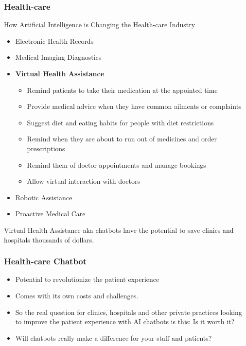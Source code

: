 \begin{frame}[fragile]\frametitle{Health-care}
How Artificial Intelligence is Changing the Health-care Industry

\begin{itemize}
\item Electronic Health Records
\item Medical Imaging Diagnostics
\item {\bf Virtual Health Assistance}
\begin{itemize}
\item Remind patients to take their medication at the appointed time
\item Provide medical advice when they have common ailments or complaints
\item  Suggest diet and eating habits for people with diet restrictions
\item  Remind when they are about to run out of medicines and order prescriptions
\item  Remind them of doctor appointments and manage bookings
\item  Allow virtual interaction with doctors
\end{itemize}
\item Robotic Assistance
\item Proactive Medical Care
\end{itemize}

Virtual Health Assistance aka chatbots have the potential to save clinics and hospitals thousands of dollars.

\end{frame}

\begin{frame}[fragile]\frametitle{Health-care Chatbot}

\begin{itemize}
\item  Potential to revolutionize the patient experience
\item Comes with its own costs and challenges.
\item So the real question for clinics, hospitals and other private practices looking to improve the patient experience with AI chatbots is this: Is it worth it?
\item Will chatbots really make a difference for your staff and patients?
\end{itemize}


\end{frame}

